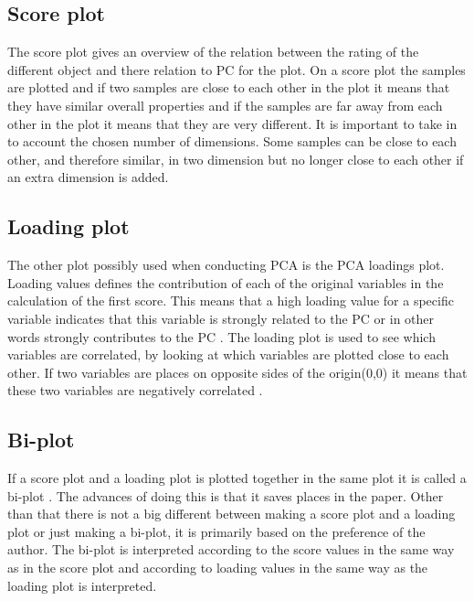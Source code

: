 \subsection*{Score plot}
The score plot gives an overview of the relation between the rating of the different object and there relation to PC for the plot. \blankline
%
%
On a score plot the samples are plotted and if two samples are close to each other in the plot it means that they have similar overall properties and if the samples are far away from each other in the plot it means that they are very different. It is important to take in to account the chosen number of dimensions. Some samples can be close to each other, and therefore similar, in two dimension but no longer close to each other if an extra dimension is added. 
%
\subsection*{Loading plot}
The other plot possibly used when conducting PCA is the PCA loadings plot.
Loading values defines the contribution of each of the original variables in the calculation of the first score. This means that a high loading value for a specific variable indicates that this variable is strongly related to the PC or in other words strongly contributes to the PC \parencite[p. 212]{Naes2010}. \blankline
%
The loading plot is used to see which variables are correlated, by looking at which variables are plotted close to each other. If two variables are places on opposite sides of the origin(0,0) it means that these two variables are negatively correlated \parencite[p. 216]{Naes2010}. 
%
\subsection*{Bi-plot}
If a score plot and a loading plot is plotted together in the same plot it is called a bi-plot  \parencite[p. 217]{Naes2010}. The advances of doing this is that it saves places in the paper. Other than that there is not a big different between making a score plot and a loading plot or just making a bi-plot, it is primarily based on the preference of the author. The bi-plot is interpreted according to the score values in the same way as in the score plot and according to loading values in the same way as the loading plot is interpreted. 
%
